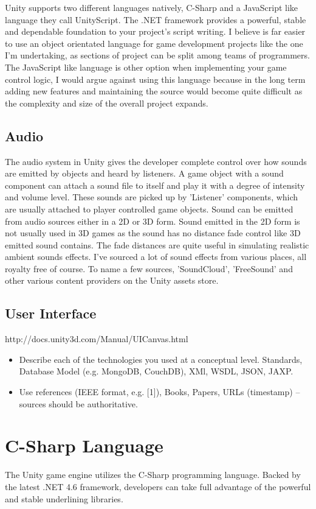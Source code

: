 Unity supports two different languages natively, C-Sharp and a JavaScript like language they call UnityScript. The .NET framework provides a powerful, stable and dependable foundation to your project's script writing. I believe is far easier to use an object orientated language for game development projects like the one I'm undertaking, as sections of project can be split among teams of programmers. 
The JavaScript like language is other option when implementing your game control logic, I would argue against using this language because in the long term adding new features and maintaining the source would become quite difficult as the complexity and size of the overall project expands.

\subsection{Audio}
The audio system in Unity gives the developer complete control over how sounds are emitted by objects and heard by listeners. A game object with a sound component can attach a sound file to itself and play it with a degree of intensity and volume level. These sounds are picked up by 'Listener' components, which are usually attached to player controlled game objects. Sound can be emitted from audio sources either in a 2D or 3D form. Sound emitted in the 2D form is not usually used in 3D games as the sound has no distance fade control like 3D emitted sound contains. The fade distances are quite useful in simulating realistic ambient sounds effects.
I’ve sourced a lot of sound effects from various places, all royalty free of course. To name a few sources, 'SoundCloud', 'FreeSound' and other various content providers on the Unity assets store.

\subsection{User Interface}
http://docs.unity3d.com/Manual/UICanvas.html

\begin{itemize}
\item Describe each of the technologies you used at a conceptual level. Standards, Database Model (e.g. MongoDB, CouchDB), XMl, WSDL, JSON, JAXP.
\item Use references (IEEE format, e.g. [1]), Books, Papers, URLs (timestamp) – sources should be authoritative. 
\end{itemize}

\section{C-Sharp Language}
The Unity game engine utilizes the C-Sharp programming language. Backed by the latest .NET 4.6 framework, developers can take full advantage of the powerful and stable underlining libraries. 

